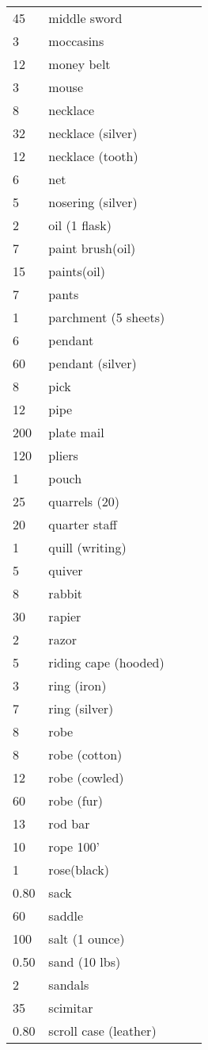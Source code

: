 \documentclass{article}
\begin{document}
\begin{longtable}{@{}p{0.18\linewidth} p{0.8\linewidth}}
45 & middle sword\\
3 & moccasins\\
12 & money belt\\
3 & mouse\\
8 & necklace\\
32 & necklace (silver)\\
12 & necklace (tooth)\\
6 & net\\
5 & nosering (silver)\\
2 & oil (1 flask)\\
7 & paint brush(oil)\\
15 & paints(oil)\\
7 & pants\\
1 & parchment (5 sheets)\\
6 & pendant\\
60 & pendant (silver)\\
8 & pick\\
12 & pipe\\
200 & plate mail\\
120 & pliers\\
1 & pouch\\
25 & quarrels (20)\\
20 & quarter staff\\
1 & quill (writing)\\
5 & quiver\\
8 & rabbit\\
30 & rapier\\
2 & razor\\
5 & riding cape (hooded)\\
3 & ring (iron)\\
7 & ring (silver)\\
8 & robe\\
8 & robe (cotton)\\
12 & robe (cowled)\\
60 & robe (fur)\\
13 & rod bar\\
10 & rope 100'\\
1 & rose(black)\\
0.80 & sack\\
60 & saddle\\
100 & salt (1 ounce)\\
0.50 & sand (10 lbs)\\
2 & sandals\\
35 & scimitar\\
0.80 & scroll case (leather)\\

\end{longtable}
\end{document}
